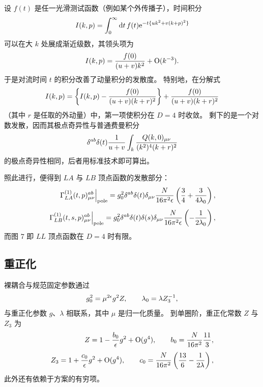 设 $f(t)$ 是任一光滑测试函数（例如某个外传播子），时间积分
\begin{equation}
   I(k,p)=\int_{0}^{\infty}\mathrm{d} t\, f(t)\mathrm{e}^{-t\{uk^2+v(k+p)^2\}}
\label{eq:5.3}
\end{equation}
可以在大 $k$ 处展成渐近级数，其领头项为
\begin{equation}
   I(k,p)={f(0)\over(u+v)k^2}+\mathrm{O}(k^{-3}).
\label{eq:5.4}
\end{equation}
于是对流时间 $t$ 的积分改善了动量积分的发散度。
特别地，在分解式
\begin{equation}
   I(k,p)=\left\{I(k,p)-{f(0)\over(u+v)(k+r)^2}\right\}+
   {f(0)\over(u+v)(k+r)^2}
   \label{eq:5.5}
\end{equation}
（其中 $r$ 是任取的外动量）中，第一项使积分在 $D=4$ 时收敛。
剩下的是一个对数发散，因而其极点奇异性与普通费曼积分
\begin{equation}
   \delta^{ab}\delta(t){1\over u+v}\int_k
   {Q(k,0)_{\mu\nu}\over(k^2)^4(k+r)^2}
   \label{eq:5.6}
\end{equation}
的极点奇异性相同，后者用标准技术即可算出。

照此进行，便得到 $LA$ 与 $LB$ 顶点函数的发散部分：
\begin{align}
   \left.\Gamma^{(1)}_{LA}(t,p)_{\mu\nu}^{ab}
   \right|_{\rm pole}
   =g_0^2\delta^{ab}\delta(t)\delta_{\mu\nu}
   {N\over16\pi^2\epsilon}
   \left({3\over4}+{3\over 4\lambda_0}\right),
   \label{eq:5.7}\\[3.5pt]
   \left.\Gamma^{(1)}_{LB}(t,s,p)_{\mu\nu}^{ab}
   \right|_{\rm pole}
   =g_0^2\delta^{ab}\delta(t)\delta(s)\delta_{\mu\nu}
   {N\over16\pi^2\epsilon}\left(-{1\over 2\lambda_0}\right),
   \label{eq:5.8}
\end{align}
而图 $7$ 即 $LL$ 顶点函数在 $D=4$ 时有限。

\subsection{重正化}

裸耦合与规范固定参数通过
\begin{equation}
   g_0^2=\mu^{2\epsilon}g^2Z,
   \qquad
   \lambda_0=\lambda Z_3^{-1},
   \label{eq:5.9}
\end{equation}
与重正化参数 $g$、$\lambda$ 相联系，其中 $\mu$ 是归一化质量。
到单圈阶，重正化常数 $Z$ 与 $Z_3$ 为
\begin{align}
   Z=1-{b_0\over\epsilon}g^2+\mathrm{O}(g^4),
   \qquad
   b_0={N\over16\pi^2}{11\over3},
   \label{eq:5.10}\\[3pt]
   Z_3=1+{c_0\over\epsilon}g^2+\mathrm{O}(g^4),
   \qquad
   c_0={N\over16\pi^2}\left({13\over6}-{1\over2\lambda}\right),
   \label{eq:5.11}
\end{align}
此外还有依赖于方案的有穷项。

